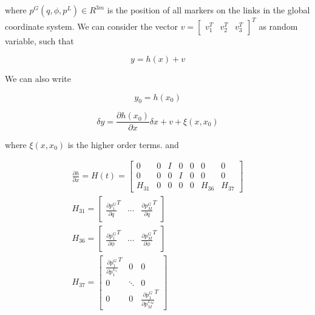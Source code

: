 \documentclass[conference]{IEEEtran}
\begin{document}
where ${p^G}(q,\phi ,{p^L}) \in {R^{3m}}$ is the position of all markers on the
links in the global coordinate system. We can consider the vector $v =
{[\begin{array}{*{20}{c}} {v_1^T}&{v_2^T}&{v_3^T}
\end{array}]^T}$ as random variable, such that

\begin{equation}
y = h(x) + v
\label{13}
\end{equation}

We can also write

\begin{equation}
{y_0} = h({x_0})
\label{14}
\end{equation}

\begin{equation}
\delta y = \frac{{\partial h({x_0})}}{{\partial x}}\delta x + v + \xi
(x,{x_0})
\label{15}
\end{equation}

where $\xi (x,{x_0})$ is the higher order terms. and

\begin{equation}
\begin{array}{l}
\frac{{\partial h}}{{\partial x}} = H(t) = \left[ {\begin{array}{*{20}{c}}
0&0&I&0&0&0&0\\
0&0&0&I&0&0&0\\
{{H_{31}}}&0&0&0&0&{{H_{36}}}&{{H_{37}}}
\end{array}} \right]\\
{H_{31}} = \left[ {\begin{array}{*{20}{c}}
{{{\frac{{\partial p_1^G}}{{\partial q}}}^T}}& \cdots &{{{\frac{{\partial p_M^G}}{{\partial q}}}^T}}
\end{array}} \right]\\
{H_{36}} = \left[ {\begin{array}{*{20}{c}}
{{{\frac{{\partial p_1^G}}{{\partial \phi }}}^T}}& \cdots &{{{\frac{{\partial p_M^G}}{{\partial \phi }}}^T}}
\end{array}} \right]\\
{H_{37}} = \left[ {\begin{array}{*{20}{c}}
{{{\frac{{\partial p_1^G}}{{\partial p_1^{{L_1}}}}}^T}}&0&0\\
0& \ddots &0\\
0&0&{{{\frac{{\partial p_1^G}}{{\partial p_M^{{L_M}}}}}^T}}
\end{array}} \right]
\end{array}
\label{16}
\end{equation}
\end{document}
